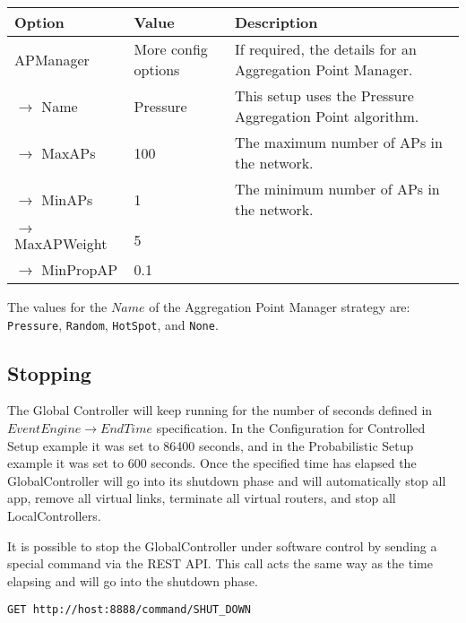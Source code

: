 {
\small

\begin{longtable}{ | p{3.4cm} | p{3.1cm} | p{7.3cm} | }

\hline
\textbf{Option} & \textbf{Value} & \textbf{Description} \\
\hline
APManager & More config options & If required, the details for
an Aggregation Point Manager. \\
\hline
 $\rightarrow$  Name & Pressure & This setup uses the Pressure
Aggregation Point algorithm. \\
\hline
 $\rightarrow$  MaxAPs & 100 & The maximum number of APs in the network. \\
\hline
 $\rightarrow$  MinAPs & 1  & The minimum number of APs in the network.  \\
\hline
 $\rightarrow$  MaxAPWeight & 5 &  \\
\hline
 $\rightarrow$  MinPropAP &  0.1 &  \\
\hline


\end{longtable}

\normalsize
}

\noindent The values for the $Name$ of the Aggregation Point Manager strategy are:
\texttt{Pressure}, 
\texttt{Random},
\texttt{HotSpot}, and
\texttt{None}.



\subsection{Stopping}

The Global Controller will keep running for the number of seconds
defined in $EventEngine \rightarrow EndTime$ specification.
In the Configuration for Controlled Setup example it was set to 86400
seconds, and in the Probabilistic Setup example it was set to 600
seconds.
Once the specified time has elapsed the GlobalController will go into
its shutdown phase and will
automatically stop all app, remove all virtual links, terminate all
virtual routers,  and stop all LocalControllers.

It is possible to stop the GlobalController under software control by
sending a special command via the REST API.
This call acts the same way as the time elapsing and will go into the
shutdown phase.


\begin{verbatim}
GET http://host:8888/command/SHUT_DOWN
\end{verbatim}

